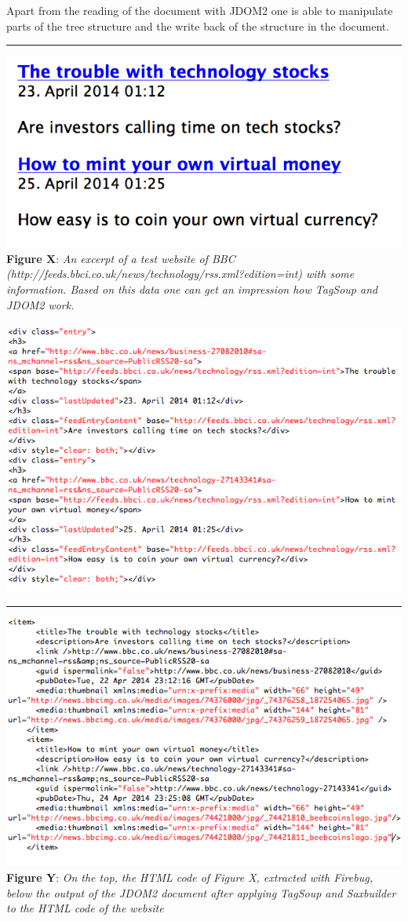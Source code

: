 Apart from the reading of the document with JDOM2 one is able to manipulate parts of the tree structure and the write back of the structure in the document. \\ \hrule\includegraphics[width=1.0\textwidth]{website_ausschnitt.png} \\\textbf{Figure X}: \textit{An excerpt of a test website of BBC \\ (http://feeds.bbci.co.uk/news/technology/rss.xml?edition=int) with some information. Based on this data one can get an impression how TagSoup and JDOM2 work.}  \\ \\\includegraphics[width=\textwidth]{html_ausschnitt.png} \\ \hrule \includegraphics[width=1.0\textwidth]{xml_ausschnitt.png}  \\\textbf{Figure Y}: \textit{On the top, the HTML code of Figure X, extracted with Firebug, below the output of the JDOM2 document after applying TagSoup and Saxbuilder to the HTML code of the website}  \\ \\ \